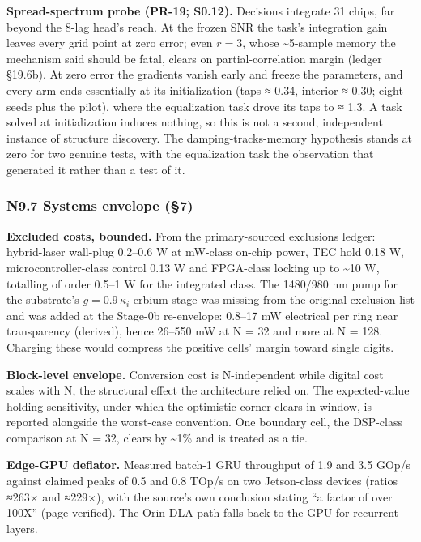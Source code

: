 \documentclass[
  10pt,
]{article}
\begin{document}
\textbf{Spread-spectrum probe (PR-19; S0.12).} Decisions integrate 31
chips, far beyond the 8-lag head's reach. At the frozen SNR the task's
integration gain leaves every grid point at zero error; even \(r = 3\),
whose \textasciitilde5-sample memory the mechanism said should be fatal,
clears on partial-correlation margin (ledger §19.6b). At zero error the
gradients vanish early and freeze the parameters, and every arm ends
essentially at its initialization (taps ≈ 0.34, interior ≈ 0.30; eight
seeds plus the pilot), where the equalization task drove its taps to ≈
1.3. A task solved at initialization induces nothing, so this is not a
second, independent instance of structure discovery. The
damping-tracks-memory hypothesis stands at zero for two genuine tests,
with the equalization task the observation that generated it rather than
a test of it.

\subsubsection{N9.7 Systems envelope
(§7)}\label{n9.7-systems-envelope-7}

\textbf{Excluded costs, bounded.} From the primary-sourced exclusions
ledger: hybrid-laser wall-plug 0.2--0.6 W at mW-class on-chip power, TEC
hold 0.18 W, microcontroller-class control 0.13 W and FPGA-class locking
up to \textasciitilde10 W, totalling of order 0.5--1 W for the
integrated class. The 1480/980 nm pump for the substrate's
\(g = 0.9\,\kappa_i\) erbium stage was missing from the original
exclusion list and was added at the Stage-0b re-envelope: 0.8--17 mW
electrical per ring near transparency (derived), hence 26--550 mW at N =
32 and more at N = 128. Charging these would compress the positive
cells' margin toward single digits.

\textbf{Block-level envelope.} Conversion cost is N-independent while
digital cost scales with N, the structural effect the architecture
relied on. The expected-value holding sensitivity, under which the
optimistic corner clears in-window, is reported alongside the worst-case
convention. One boundary cell, the DSP-class comparison at N = 32,
clears by \textasciitilde1\% and is treated as a tie.

\textbf{Edge-GPU deflator.} Measured batch-1 GRU throughput of 1.9 and
3.5 GOp/s against claimed peaks of 0.5 and 0.8 TOp/s on two Jetson-class
devices (ratios ≈263× and ≈229×), with the source's own conclusion
stating ``a factor of over 100X'' (page-verified). The Orin DLA path
falls back to the GPU for recurrent layers.
\end{document}
